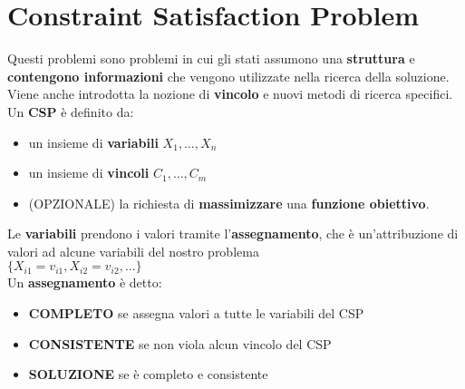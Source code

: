 \documentclass[14pt]{extarticle}
\begin{document}
\section{Constraint Satisfaction Problem}
Questi problemi sono problemi in cui gli stati assumono una \textbf{struttura} e \textbf{contengono informazioni} che vengono utilizzate nella ricerca della soluzione.\\
Viene anche introdotta la nozione di  \textbf{vincolo} e nuovi metodi di ricerca specifici.\\
Un \textbf{CSP} è definito da:
\begin{itemize}
    \item un insieme di \textbf{variabili} $X_1, \dots,X_n$
    \item un insieme di \textbf{vincoli} $C_1, \dots,C_m$
    \item (OPZIONALE) la richiesta di \textbf{massimizzare} una \textbf{funzione obiettivo}.
\end{itemize}
Le \textbf{variabili} prendono i valori tramite l'\textbf{assegnamento}, che è un'attribuzione di valori ad alcune variabili del nostro problema\\
 $\{X_{i1}=v_{i1}, X_{i2}=v_{i2}, \dots\}$\\
Un \textbf{assegnamento} è detto:
\begin{itemize}
    \item \textbf{COMPLETO} se assegna valori a tutte le variabili del CSP
    \item \textbf{CONSISTENTE} se non viola alcun vincolo del CSP
    \item \textbf{SOLUZIONE} se è completo e consistente
\end{itemize}
\end{document}
